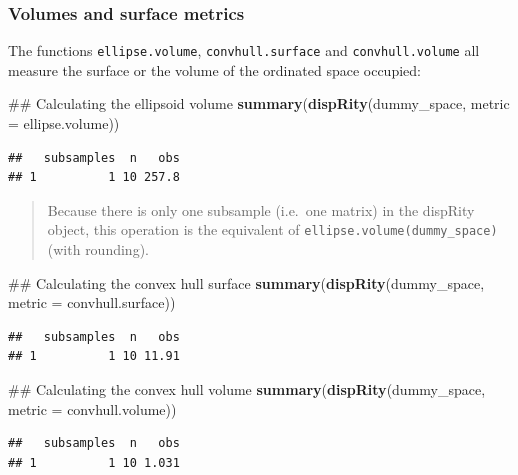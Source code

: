 \documentclass[]{book}
\newenvironment{Shaded}{\begin{snugshade}}{\end{snugshade}}
\newcommand{\KeywordTok}[1]{\textcolor[rgb]{0.13,0.29,0.53}{\textbf{#1}}}
\newcommand{\DataTypeTok}[1]{\textcolor[rgb]{0.13,0.29,0.53}{#1}}
\newcommand{\NormalTok}[1]{#1}
\theoremstyle{definition}
\theoremstyle{definition}
\theoremstyle{remark}
\begin{document}
\subsubsection{Volumes and surface
metrics}\label{volumes-and-surface-metrics}

The functions \texttt{ellipse.volume}, \texttt{convhull.surface} and
\texttt{convhull.volume} all measure the surface or the volume of the
ordinated space occupied:

\begin{Shaded}
\begin{Highlighting}[]
\NormalTok{## Calculating the ellipsoid volume}
\KeywordTok{summary}\NormalTok{(}\KeywordTok{dispRity}\NormalTok{(dummy_space, }\DataTypeTok{metric =}\NormalTok{ ellipse.volume))}
\end{Highlighting}
\end{Shaded}

\begin{verbatim}
##   subsamples  n   obs
## 1          1 10 257.8
\end{verbatim}

\begin{quote}
Because there is only one subsample (i.e.~one matrix) in the dispRity
object, this operation is the equivalent of
\texttt{ellipse.volume(dummy\_space)} (with rounding).
\end{quote}

\begin{Shaded}
\begin{Highlighting}[]
\NormalTok{## Calculating the convex hull surface}
\KeywordTok{summary}\NormalTok{(}\KeywordTok{dispRity}\NormalTok{(dummy_space, }\DataTypeTok{metric =}\NormalTok{ convhull.surface))}
\end{Highlighting}
\end{Shaded}

\begin{verbatim}
##   subsamples  n   obs
## 1          1 10 11.91
\end{verbatim}

\begin{Shaded}
\begin{Highlighting}[]
\NormalTok{## Calculating the convex hull volume}
\KeywordTok{summary}\NormalTok{(}\KeywordTok{dispRity}\NormalTok{(dummy_space, }\DataTypeTok{metric =}\NormalTok{ convhull.volume))}
\end{Highlighting}
\end{Shaded}

\begin{verbatim}
##   subsamples  n   obs
## 1          1 10 1.031
\end{verbatim}
\end{document}
